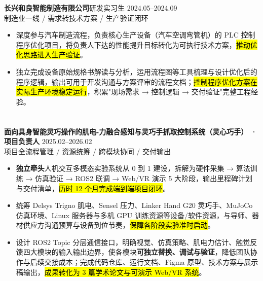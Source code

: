 \vspace{0.30em}
{\small\textbf{长兴和良智能制造有限公司}}\quad 研发实习生 \hfill {2024.05--2024.09} \\
{\scriptsize\color{WHU_Blue} 制造业一线 / 需求转技术方案 / 生产验证闭环}
\begin{itemize}
    \item 深度参与汽车制造流程，负责核心生产设备（汽车空调弯管机）的 PLC 控制程序优化项目，将负责人下达的性能提升目标转化为可执行技术方案，\hl{推动优化思路进入生产验证}。
    \item 独立完成设备原始规格书解读与分析，运用流程图等工具梳理与设计优化后的程序逻辑，输出可用于开发沟通与方案评审的流程文档；\hl{控制程序优化方案在实际生产环境稳定运行}，积累"现场需求 → 控制逻辑 → 交付验证"完整工程经验。
\end{itemize}

\vspace{0.04em}
\section[科研与项目经历]{}
{\small\textbf{面向具身智能灵巧操作的肌电-力融合感知与灵巧手抓取控制系统（灵心巧手） · 项目负责人}} \hfill {2025.02--2026.02} \\
{\scriptsize\color{WHU_Blue} 项目全流程管理 / 资源统筹 / 跨模块协同 / 交付输出}
\begin{itemize}
    \item \textbf{独立牵头}人机交互多模态实验系统从 0 到 1 建设，拆解为硬件采集 → 算法训练 → 仿真验证 → ROS2 联调 → Web/VR 演示 5 大阶段，输出里程碑计划与交付清单，\hl{历时 12 个月完成端到端项目闭环}。
    \item 统筹 Delsys Trigno 肌电、Sensel 压力、Linker Hand G20 灵巧手、MuJoCo 仿真环境、Linux 服务器与多机 GPU 训练资源等设备/软件资源，与导师、器材供应方沟通预算与设备到位节奏，\hl{保障各阶段实验准时启动}。
    \item 设计 ROS2 Topic 分层通信接口，明确视觉、仿真策略、肌电力估计、触觉反馈四大模块的输入输出边界，使各模块\textbf{可独立替换、调试与验证}，降低团队协作与后续交接成本；完成代码仓库、运行文档、Figma 原型、技术方案与展示稿输出，\hl{成果转化为 3 篇学术论文与可演示 Web/VR 系统}。
\end{itemize}

